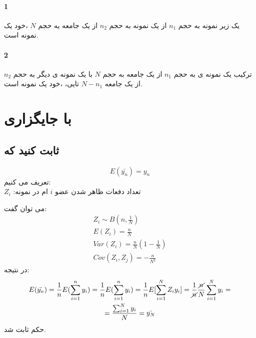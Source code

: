 \paragraph*{1}
یک زیر نمونه 
به حجم 
$n_1$
از یک نمونه به حجم 
$n_2$
از یک جامعه یه حجم 
$N$
،خود یک نمونه 
است.
\paragraph*{2}
ترکیب یک نمونه ی 
به حجم 
$n_1$
از یک جامعه به حجم 
$N$
با یک نمونه ی دیگر
به حجم 
$n_2$
از یک جامعه 
$N-n_1$
تایی،
،خود یک نمونه 
است.
\section*{با جایگزاری}
\subsection*{ثابت کنید که }
\begin{equation*}
	E(\bar{y_n})=y_n
\end{equation*}
تعریف می کنیم:
\\
$Z_i$
:تعداد دفعات ظاهر شدن عضو
$i$
ام در نمونه 

می توان گفت:
\begin{gather*}
	Z_i\sim B(n,\frac{1}{N}) \\
	E(Z_i)=\frac{n}{N} \\
	Var(Z_i)=\frac{n}{N}(1-\frac{1}{N}) \\
	Cov(Z_i,Z_j)=-\frac{n}{N^2}
\end{gather*}
در نتیجه:
\begin{multline*}
	E(\bar{y_n})=\frac{1}{n}E(\sum_{i=1}^ny_i)=\frac{1}{n}E(\sum_{i=1}^ny_i)
	=\frac{1}{n}E[\sum_{i=1}^{N}Z_iy_i]=\frac{1}{\cancel{n}}\frac{\cancel{n}}{N}\sum_{i=1}^{N}y_i
	=\\=
	\frac{\sum_{i=1}^{N}y_i}{N}=\bar{y_N}
\end{multline*}
حکم ثابت شد.
